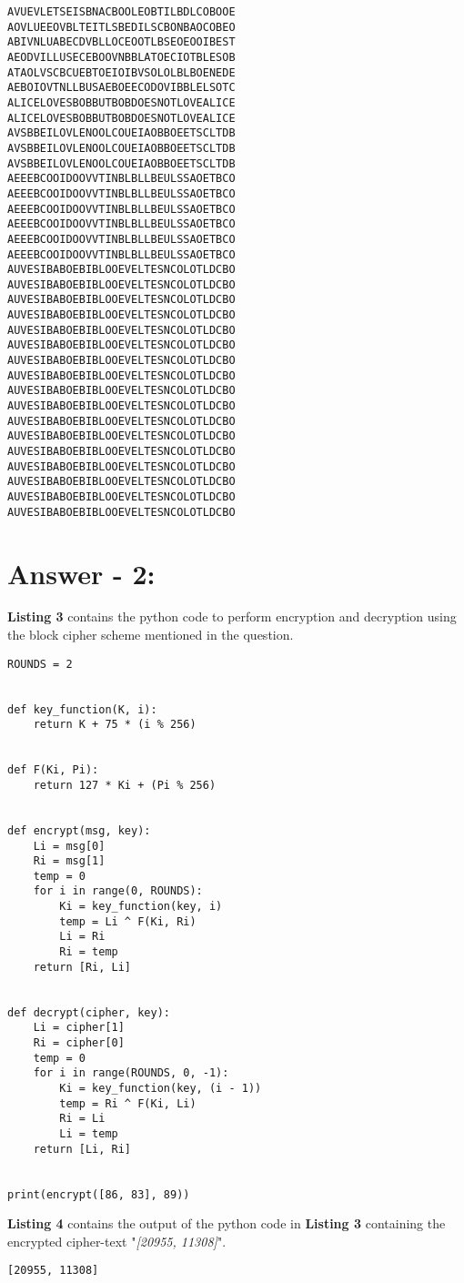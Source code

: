 \documentclass[10pt,a4paper,oneside]{article}
\begin{document}
\lstset{keywordstyle=\bfseries}
\begin{lstlisting}
AVUEVLETSEISBNACBOOLEOBTILBDLCOBOOE
AOVLUEEOVBLTEITLSBEDILSCBONBAOCOBEO
ABIVNLUABECDVBLLOCEOOTLBSEOEOOIBEST
AEODVILLUSECEBOOVNBBLATOECIOTBLESOB
ATAOLVSCBCUEBTOEIOIBVSOLOLBLBOENEDE
AEBOIOVTNLLBUSAEBOEECODOVIBBLELSOTC
ALICELOVESBOBBUTBOBDOESNOTLOVEALICE
ALICELOVESBOBBUTBOBDOESNOTLOVEALICE
AVSBBEILOVLENOOLCOUEIAOBBOEETSCLTDB
AVSBBEILOVLENOOLCOUEIAOBBOEETSCLTDB
AVSBBEILOVLENOOLCOUEIAOBBOEETSCLTDB
AEEEBCOOIDOOVVTINBLBLLBEULSSAOETBCO
AEEEBCOOIDOOVVTINBLBLLBEULSSAOETBCO
AEEEBCOOIDOOVVTINBLBLLBEULSSAOETBCO
AEEEBCOOIDOOVVTINBLBLLBEULSSAOETBCO
AEEEBCOOIDOOVVTINBLBLLBEULSSAOETBCO
AEEEBCOOIDOOVVTINBLBLLBEULSSAOETBCO
AUVESIBABOEBIBLOOEVELTESNCOLOTLDCBO
AUVESIBABOEBIBLOOEVELTESNCOLOTLDCBO
AUVESIBABOEBIBLOOEVELTESNCOLOTLDCBO
AUVESIBABOEBIBLOOEVELTESNCOLOTLDCBO
AUVESIBABOEBIBLOOEVELTESNCOLOTLDCBO
AUVESIBABOEBIBLOOEVELTESNCOLOTLDCBO
AUVESIBABOEBIBLOOEVELTESNCOLOTLDCBO
AUVESIBABOEBIBLOOEVELTESNCOLOTLDCBO
AUVESIBABOEBIBLOOEVELTESNCOLOTLDCBO
AUVESIBABOEBIBLOOEVELTESNCOLOTLDCBO
AUVESIBABOEBIBLOOEVELTESNCOLOTLDCBO
AUVESIBABOEBIBLOOEVELTESNCOLOTLDCBO
AUVESIBABOEBIBLOOEVELTESNCOLOTLDCBO
AUVESIBABOEBIBLOOEVELTESNCOLOTLDCBO
AUVESIBABOEBIBLOOEVELTESNCOLOTLDCBO
AUVESIBABOEBIBLOOEVELTESNCOLOTLDCBO
AUVESIBABOEBIBLOOEVELTESNCOLOTLDCBO
\end{lstlisting}

\section*{Answer - 2:}

\textbf{Listing 3} contains the python code to perform encryption and decryption using the block cipher scheme mentioned in the question. 

\begin{lstlisting}
ROUNDS = 2


def key_function(K, i):
    return K + 75 * (i % 256)


def F(Ki, Pi):
    return 127 * Ki + (Pi % 256)


def encrypt(msg, key):
    Li = msg[0]
    Ri = msg[1]
    temp = 0
    for i in range(0, ROUNDS):
        Ki = key_function(key, i)
        temp = Li ^ F(Ki, Ri)
        Li = Ri
        Ri = temp
    return [Ri, Li]


def decrypt(cipher, key):
    Li = cipher[1]
    Ri = cipher[0]
    temp = 0
    for i in range(ROUNDS, 0, -1):
        Ki = key_function(key, (i - 1))
        temp = Ri ^ F(Ki, Li)
        Ri = Li
        Li = temp
    return [Li, Ri]


print(encrypt([86, 83], 89))
\end{lstlisting}
\textbf{Listing 4} contains the output of the python code in \textbf{Listing 3} containing the encrypted cipher-text "\textit{[20955, 11308]}".

\begin{lstlisting}
[20955, 11308]
\end{lstlisting}
\end{document}
